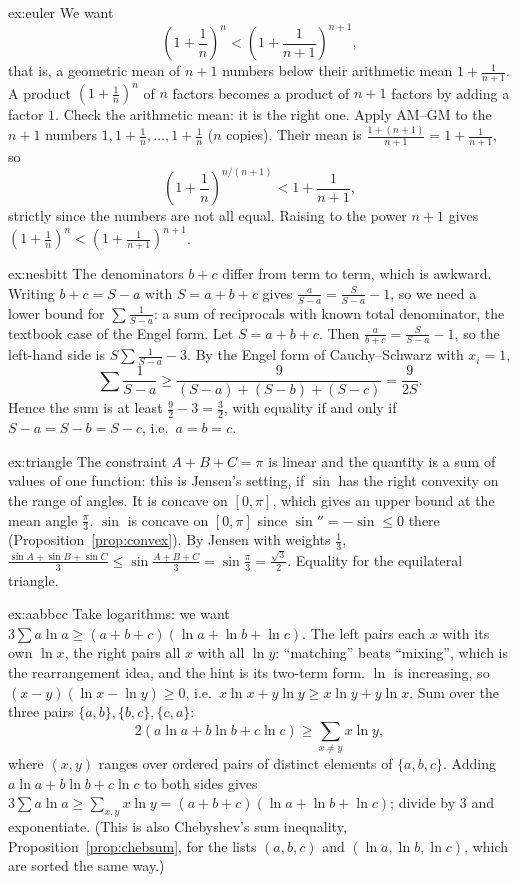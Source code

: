 \begin{solution}{ex:euler}
\idea We want
\[
\left(1+\frac1n\right)^n<\left(1+\frac1{n+1}\right)^{n+1},
\]
that is, a geometric mean of $n+1$ numbers below their arithmetic mean $1+\frac1{n+1}$. A product $\left(1+\frac1n\right)^n$ of $n$ factors becomes a product of $n+1$ factors by adding a factor $1$. Check the arithmetic mean: it is the right one.
\writeup Apply AM--GM to the $n+1$ numbers $1,1+\frac1n,\dots,1+\frac1n$ ($n$ copies). Their mean is $\frac{1+(n+1)}{n+1}=1+\frac1{n+1}$, so
\[
\left(1+\frac1n\right)^{n/(n+1)}<1+\frac1{n+1},
\]
strictly since the numbers are not all equal. Raising to the power $n+1$ gives $\left(1+\frac1n\right)^n<\left(1+\frac1{n+1}\right)^{n+1}$.
\end{solution}

\begin{solution}{ex:nesbitt}
\idea The denominators $b+c$ differ from term to term, which is awkward. Writing $b+c=S-a$ with $S=a+b+c$ gives $\frac a{S-a}=\frac S{S-a}-1$, so we need a lower bound for $\sum\frac1{S-a}$: a sum of reciprocals with known total denominator, the textbook case of the Engel form.
\writeup Let $S=a+b+c$. Then $\frac a{b+c}=\frac S{S-a}-1$, so the left-hand side is $S\sum\frac1{S-a}-3$. By the Engel form of Cauchy--Schwarz
with $x_i=1$,
\[
\sum\frac1{S-a}\ge\frac9{(S-a)+(S-b)+(S-c)}=\frac9{2S}.
\]
Hence the sum is at least $\frac92-3=\frac32$, with equality if and only if $S-a=S-b=S-c$, i.e.\ $a=b=c$.
\end{solution}

\begin{solution}{ex:triangle}
\idea The constraint $A+B+C=\pi$ is linear and the quantity is a sum of values of one function: this is Jensen's setting, if $\sin$ has the right convexity on the range of angles. It is concave on $[0,\pi]$, which gives an upper bound at the mean angle $\frac\pi3$.
\writeup $\sin$ is concave on $[0,\pi]$ since $\sin''=-\sin\le0$ there (Proposition~\ref{prop:convex}). By Jensen with weights $\frac13$,
$\frac{\sin A+\sin B+\sin C}3\le\sin\frac{A+B+C}3=\sin\frac\pi3=\frac{\sqrt3}2$. Equality for the equilateral triangle.
\end{solution}

\begin{solution}{ex:aabbcc}
\idea Take logarithms: we want $3\sum a\ln a\ge(a+b+c)(\ln a+\ln b+\ln c)$. The left pairs each $x$ with its own $\ln x$, the right pairs all $x$ with all $\ln y$: ``matching'' beats ``mixing'', which is the rearrangement idea, and the hint is its two-term form.
\writeup $\ln$ is increasing, so $(x-y)(\ln x-\ln y)\ge0$, i.e.\ $x\ln x+y\ln y\ge x\ln y+y\ln x$. Sum over the three pairs $\{a,b\},\{b,c\},\{c,a\}$:
\[
2(a\ln a+b\ln b+c\ln c)\ge\sum_{x\ne y}x\ln y,
\]
where $(x,y)$ ranges over ordered pairs of distinct elements of $\{a,b,c\}$. Adding $a\ln a+b\ln b+c\ln c$ to both sides gives $3\sum a\ln a\ge\sum_{x,y}x\ln y=(a+b+c)(\ln a+\ln b+\ln c)$;
divide by $3$ and exponentiate. (This is also Chebyshev's sum inequality, Proposition~\ref{prop:chebsum}, for the lists $(a,b,c)$ and $(\ln a,\ln b,\ln c)$, which are sorted the same way.)
\end{solution}

